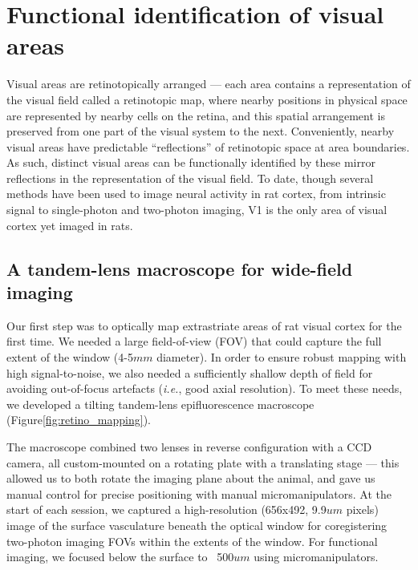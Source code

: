 \section{Functional identification of visual areas}
Visual areas are retinotopically arranged --- each area contains a representation of the visual field called a retinotopic map, where nearby positions in physical space are represented by nearby cells on the retina, and this spatial arrangement is preserved from one part of the visual system to the next. Conveniently, nearby visual areas have predictable ``reflections'' of retinotopic space at area boundaries. As such, distinct visual areas can be functionally identified by these mirror reflections in the representation of the visual field. To date, though several methods have been used to image neural activity in rat cortex, from intrinsic signal\cite{Gias2005} to single-photon \cite{Scott2018} and two-photon \cite{Ohki2005, Greenberg2008} imaging, V1 is the only area of visual cortex yet imaged in rats.

\subsection{A tandem-lens macroscope for wide-field imaging}
Our first step was to optically map extrastriate areas of rat visual cortex for the first time. We needed a large field-of-view (FOV) that could capture the full extent of the window (4-5$mm$ diameter). In order to ensure robust mapping with high signal-to-noise, we also needed a sufficiently shallow depth of field for avoiding out-of-focus artefacts (\textit{i.e.}, good axial resolution). To meet these needs, we developed a tilting tandem-lens epifluorescence macroscope\cite{Ratzlaff1991} (Figure\ref{fig:retino_mapping}). 

The macroscope combined two lenses in reverse configuration with a CCD camera, all custom-mounted on a rotating plate with a translating stage --- this allowed us to both rotate the imaging plane about the animal, and gave us manual control for precise positioning with manual micromanipulators. At the start of each session, we captured a high-resolution (656x492, 9.9$um$ pixels) image of the surface vasculature beneath the optical window for coregistering two-photon imaging FOVs within the extents of the window. For functional imaging, we focused below the surface to ~500$um$ using micromanipulators.

